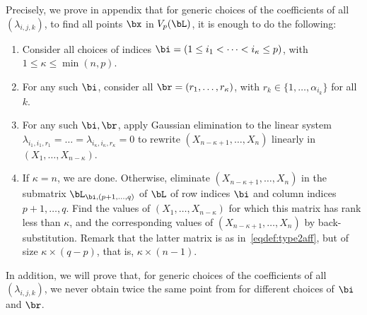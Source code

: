 \documentclass[12pt]{article}
\begin{document}
Precisely, we prove in appendix that for generic choices of the
coefficients of all $(\lambda_{i,j,k})$, to find all points
$\bx$ in $V_p(\bL)$, it is enough to do the following:
\begin{enumerate}
\item Consider all choices of indices $\bi = (1\le i_1 < \dots <
  i_\kappa\le p)$, with $1 \leq \kappa \leq\min(n,p)$.
\item For any such $\bi$, consider all $\br = (r_1,\dots,r_\kappa)$,
  with $r_k \in \{1,\dots,\alpha_{i_k}\}$ for all $k$.
\item For any such $\bi,\br$, apply Gaussian elimination to the linear
  system
  $\lambda_{i_1,i_1,r_1}=\dots=\lambda_{i_\kappa,i_\kappa,r_\kappa}=0$
  to rewrite $(X_{n-\kappa+1}, \ldots, X_n)$  linearly in $(X_1,
  \ldots, X_{n-\kappa})$.
\item If $\kappa = n$, we are done. Otherwise, 
  eliminate $(X_{n-\kappa+1}, \ldots, X_n)$ in the submatrix
  $\bL_{\bi,(p+1, \ldots, q)}$ of $\bL$ of row indices $\bi$ and
  column indices $p+1,\dots,q$. Find the values of $(X_1, \ldots,
  X_{n-\kappa})$ for which this matrix has rank less than $\kappa$,
  and the corresponding values of $(X_{n-\kappa+1}, \ldots, X_n)$ by
  back-substitution. Remark that the latter matrix is as
  in~\eqref{eqdef:type2aff}, but of size $\kappa \times (q-p)$, that
  is, $ \kappa\times (n-1)$.
\end{enumerate}
In addition, we will prove that, for generic choices of the
coefficients of all $(\lambda_{i,j,k})$, we never obtain 
twice the same point from for different choices of $\bi$ and $\br$.
\end{document}
